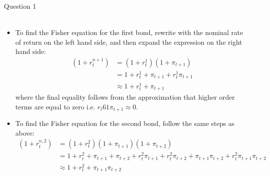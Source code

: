 \documentclass[a4paper]{article}
\newif\IfInSansMode
\begin{document}
\begin{questionbox}{Question 1}
\begin{enumerate}[(a)]
\begin{explanationbox}
\begin{itemize}
\begin{align*}
					\end{align*}
				\end{itemize}
			\end{explanationbox}
			\begin{explanationbox}
				\begin{itemize}
					\item To find the Fisher equation for the first bond, rewrite with the nominal rate of return on the left hand side, and then expand the expression on the right hand side:
					\begin{align*}
						(1+r_t^{n+1}) &= (1+r_t^1)(1+\pi_{t+1})\\
						&=  1 + r_t^1 + \pi_{t+1} + r_t^1 \pi_{t+1}\\
						&\approx 1 + r_t^1 + \pi_{t+1}
					\end{align*}
					where the final equality follows from the approximation that higher order terms are equal to zero i.e. \( r_t61 \pi_{t+1} \approx 0 \).
					\item To find the Fisher equation for the second bond, follow the same steps as above:
					\begin{align*}
						(1+r_t^{n,2}) &= (1+r_t^2)(1+\pi_{t+1})(1+\pi_{t+2})\\
						&= 1 + r_t^2 + \pi_{t+1} + \pi_{t+2} + r_t^2 \pi_{t+1} + r_t^2 \pi_{t+2} + \pi_{t+1}\pi_{t+2} + r_t^2\pi_{t+1}\pi_{t+2}\\
						&\approx 1 + r_t^2 + \pi_{t+1} \pi_{t+2}
					\end{align*}
				\end{itemize}
			\end{explanationbox}
		\end{enumerate}
	\end{questionbox}
\end{document}
